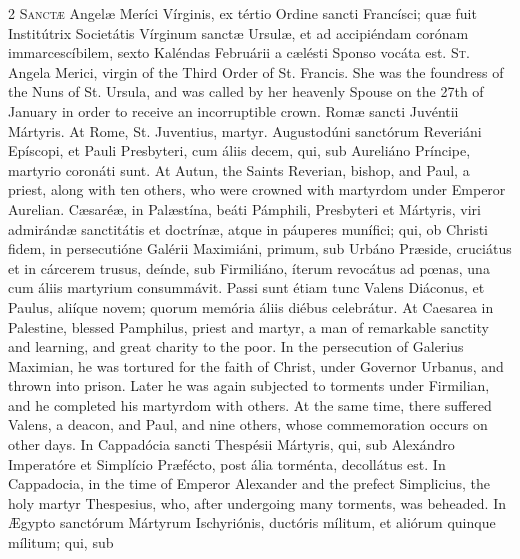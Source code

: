 \begin{paracol}{2}
\lettrine[lines=2]{S}{anctæ} Angelæ Meríci 
 Vírginis, ex tértio Ordine sancti Francísci; quæ fuit Institútrix Societátis 
 Vírginum sanctæ Ursulæ, et ad accipiéndam corónam immarcescíbilem, sexto 
 Kaléndas Februárii a cælésti Sponso vocáta est.
\switchcolumn
{}
\lettrine[lines=2]{S}{t.} Angela Merici, virgin of the 
 Third Order of St. Francis. She was the foundress of the Nuns of St. 
 Ursula, and was called by her heavenly Spouse on the 27th of January in 
 order to receive an incorruptible crown.
\switchcolumn*
{}
Romæ sancti Juvéntii 
 Mártyris.
\switchcolumn
{}
At Rome, St. Juventius, martyr.
\switchcolumn*
{}
Augustodúni sanctórum 
 Reveriáni Epíscopi, et Pauli Presbyteri, cum áliis decem, qui, sub Aureliáno 
 Príncipe, martyrio coronáti sunt.
\switchcolumn
{}
At Autun, the Saints Reverian, 
 bishop, and Paul, a priest, along with ten others, who were crowned with 
 martyrdom under Emperor Aurelian.
\switchcolumn*
{}
Cæsaréæ, in Palæstína, 
 beáti Pámphili, Presbyteri et Mártyris, viri admirándæ sanctitátis et 
 doctrínæ, atque in páuperes munífici; qui, ob Christi fidem, in persecutióne 
 Galérii Maximiáni, primum, sub Urbáno Præside, cruciátus et in cárcerem 
 trusus, deínde, sub Firmiliáno, íterum revocátus ad pœnas, una cum áliis 
 martyrium consummávit. Passi sunt étiam tunc Valens Diáconus, et 
 Paulus, aliíque novem; quorum memória áliis diébus celebrátur.
\switchcolumn
{}
At Caesarea in Palestine, blessed 
 Pamphilus, priest and martyr, a man of remarkable sanctity and learning, and 
 great charity to the poor. In the persecution of Galerius Maximian, he 
 was tortured for the faith of Christ, under Governor Urbanus, and thrown 
 into prison. Later he was again subjected to torments under Firmilian, 
 and he completed his martyrdom with others. At the same time, there 
 suffered Valens, a deacon, and Paul, and nine others, whose commemoration 
 occurs on other days.
\switchcolumn*
{}
In Cappadócia sancti 
 Thespésii Mártyris, qui, sub Alexándro Imperatóre et Simplício Præfécto, post 
 ália torménta, decollátus est.
\switchcolumn
{}
In Cappadocia, in the time of 
 Emperor Alexander and the prefect Simplicius, the holy martyr Thespesius, 
 who, after undergoing many torments, was beheaded.
\switchcolumn*
{}
In Ægypto sanctórum 
 Mártyrum Ischyriónis, ductóris mílitum, et aliórum quinque mílitum; qui, sub 

\end{paracol}
